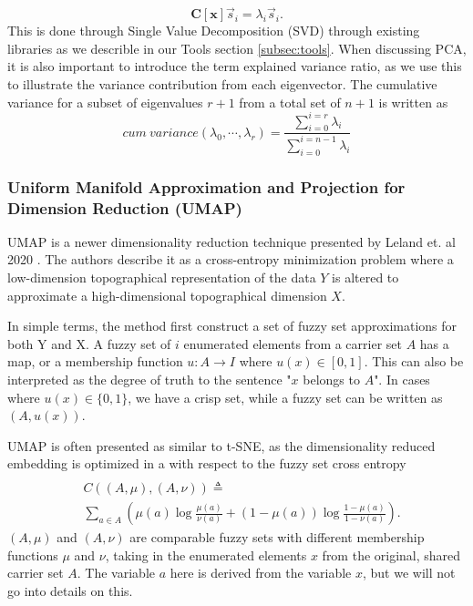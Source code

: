 \begin{equation}
    \boldsymbol{C[x]} \vec{s}_i= \lambda_i\vec{s}_i.
\end{equation}
%
This is done through Single Value Decomposition (SVD) through existing libraries as we describle in our Tools section \ref{subsec:tools}. When discussing PCA, it is also important to introduce the term explained variance ratio, as we use this to illustrate the variance contribution from each eigenvector. The cumulative variance for a subset of eigenvalues $r+1$ from a total set of $n+1$ is written as
\begin{equation}
    cum\ variance(\lambda_0, \cdots, \lambda_r)  = \frac{\sum_{i = 0}^{i = r} \lambda_i}{\sum_{i = 0}^{i = n-1} \lambda_i}
\end{equation}



\subsubsection{Uniform Manifold Approximation and Projection for Dimension Reduction (UMAP)}
UMAP is a newer dimensionality reduction technique presented by Leland et. al 2020 \cite{umap}. The authors describe it as a cross-entropy minimization problem where a low-dimension topographical representation of the data $Y$ is altered to approximate a high-dimensional topographical dimension $X$.

In simple terms, the method first construct a set of fuzzy set approximations for both Y and X. A fuzzy set of $i$ enumerated elements from a carrier set $A$ has a map, or a membership function $u : A \rightarrow I$ where $u(x) \in [0, 1]$. This can also be interpreted as the degree of truth to the sentence "$x$ belongs to $A$". In cases where $u(x) \in \{0, 1\}$, we have a crisp set, while a fuzzy set can be written as $(A, u(x))$. 

UMAP is often presented as similar to t-SNE, as the dimensionality reduced embedding is optimized in a with respect to the fuzzy set cross entropy
\begin{equation}
\begin{split}
& \\
&C\left((A, \mu), (A, \nu)\right) \triangleq \\
&\sum_{a \in A} \left(\mu(a) \log \frac{\mu(a)}{\nu(a)} + (1 - \mu(a)) \log \frac{1 - \mu(a)}{1 - \nu(a)}\right).
\end{split}
\end{equation}
$(A, \mu)$ and $(A, \nu)$ are comparable fuzzy sets with different membership functions $\mu$ and $\nu$, taking in the enumerated elements $x$ from the original, shared carrier set $A$. The variable $a$ here is derived from the variable $x$, but we will not go into details on this. 

